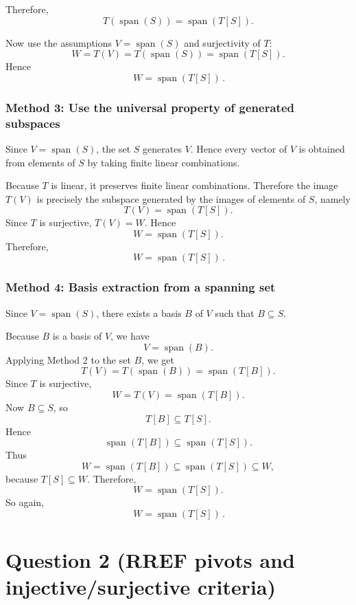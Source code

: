 \documentclass[12pt]{article}
\begin{document}
Therefore,
\[
T(\operatorname{span}(S))=\operatorname{span}(T[S]).
\]

Now use the assumptions $V=\operatorname{span}(S)$ and surjectivity of $T$:
\[
W=T(V)=T(\operatorname{span}(S))=\operatorname{span}(T[S]).
\]
Hence
\[
\boxed{\,W=\operatorname{span}(T[S])\,}.
\]

\subsubsection{Method 3: Use the universal property of generated subspaces}
Since $V=\operatorname{span}(S)$, the set $S$ generates $V$. Hence every vector of $V$ is obtained from elements of $S$ by taking finite linear combinations.

Because $T$ is linear, it preserves finite linear combinations. Therefore the image $T(V)$ is precisely the subspace generated by the images of elements of $S$, namely
\[
T(V)=\operatorname{span}(T[S]).
\]
Since $T$ is surjective, $T(V)=W$. Hence
\[
W=\operatorname{span}(T[S]).
\]
Therefore,
\[
\boxed{\,W=\operatorname{span}(T[S])\,}.
\]

\subsubsection{Method 4: Basis extraction from a spanning set}
Since $V=\operatorname{span}(S)$, there exists a basis $B$ of $V$ such that $B\subseteq S$.

Because $B$ is a basis of $V$, we have
\[
V=\operatorname{span}(B).
\]
Applying Method 2 to the set $B$, we get
\[
T(V)=T(\operatorname{span}(B))=\operatorname{span}(T[B]).
\]
Since $T$ is surjective,
\[
W=T(V)=\operatorname{span}(T[B]).
\]
Now $B\subseteq S$, so
\[
T[B]\subseteq T[S].
\]
Hence
\[
\operatorname{span}(T[B])\subseteq \operatorname{span}(T[S]).
\]
Thus
\[
W=\operatorname{span}(T[B])\subseteq \operatorname{span}(T[S])\subseteq W,
\]
because $T[S]\subseteq W$. Therefore,
\[
W=\operatorname{span}(T[S]).
\]
So again,
\[
\boxed{\,W=\operatorname{span}(T[S])\,}.
\]


\section{Question 2 (RREF pivots and injective/surjective criteria)}
\end{document}
